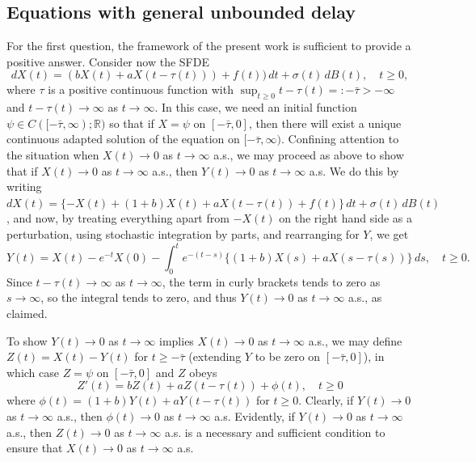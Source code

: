 \documentclass[a4paper,10pt,reqno]{amsart}
\numberwithin{equation}{section}
\theoremstyle{definition}
\theoremstyle{remark}
\DeclareMathOperator{\1}{\mathbbm 1}
\begin{document}
\subsection{Equations with general unbounded delay}
For the first question, the framework of the present work is sufficient to provide a positive answer. Consider now the SFDE
\begin{equation}\label{eq.sfde}
dX(t)=(bX(t)+aX(t-\tau(t)))+f(t))\,dt + \sigma(t)\,dB(t), \quad t\geq 0,
\end{equation}
where $\tau$ is a positive continuous function with $\sup_{t\geq 0} t-\tau(t)=:-\bar{\tau}>-\infty$ and $t-\tau(t)\to \infty$ as $t\to\infty$. In this case, we need an initial function $\psi\in C([-\bar{\tau},\infty);\mathbb{R})$ so that if  $X=\psi$ on $[-\bar{\tau},0]$, then there will exist a unique continuous adapted solution of the equation on $[-\bar{\tau},\infty)$. Confining attention to the situation when $X(t)\to 0$ as $t\to\infty$ a.s., we may proceed as above to show that if $X(t)\to 0$ as $t\to\infty$ a.s., then $Y(t)\to 0$ as $t\to\infty$ a.s. We do this by writing $dX(t)=\{-X(t)+(1+b)X(t)+aX(t-\tau(t))+f(t)\}\,dt + \sigma(t)\,dB(t)$, and now, by treating everything apart from $-X(t)$ on the right hand side as a perturbation, using stochastic integration by parts, and rearranging for $Y$, we get  
\begin{equation} \label{eq.YXgeneral}
Y(t)= X(t)-e^{-t}X(0)-\int_{0}^t e^{-(t-s)}\{(1+b)X(s)+aX(s-\tau(s))\}\,ds, \quad t\geq 0.
\end{equation}
Since $t-\tau(t)\to \infty$ as $t\to\infty$, the term in curly brackets tends to zero as $s\to\infty$, so the integral tends to zero, and thus $Y(t)\to 0$ as $t\to\infty$ a.s., as claimed.

To show $Y(t)\to 0$ as $t\to\infty$ implies  $X(t)\to 0$ as $t\to\infty$ a.s., we may define 
$Z(t)=X(t)-Y(t)$ for $t\geq -\bar{\tau}$ (extending $Y$ to be zero on $[-\bar{\tau},0]$), in which case $Z=\psi$ on $[-\bar{\tau},0]$ and $Z$ obeys
\[
Z'(t)=bZ(t)+aZ(t-\tau(t))+\phi(t), \quad t\geq 0
\]  
where $\phi(t)=(1+b)Y(t)+aY(t-\tau(t))$ for $t\geq 0$. Clearly, if $Y(t)\to 0$ as $t\to\infty$ a.s., then $\phi(t)\to 0$ as $t\to\infty$ a.s. Evidently, if $Y(t)\to 0$ as $t\to\infty$ a.s., then $Z(t)\to 0$ as $t\to\infty$ a.s. is a necessary and sufficient condition to ensure that $X(t)\to 0$ as $t\to\infty$ a.s.
\end{document}
